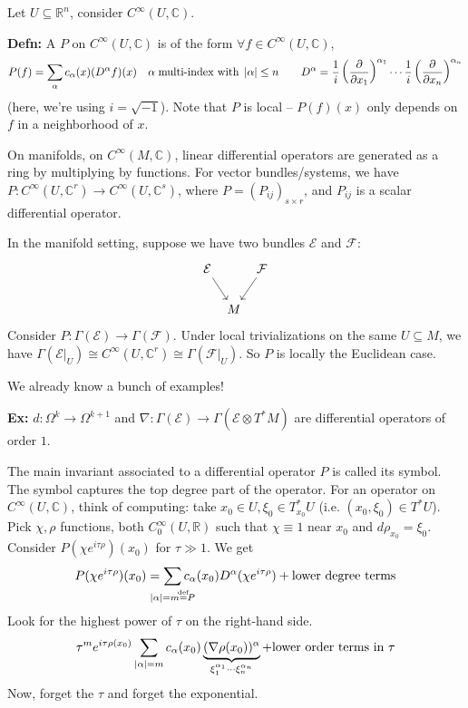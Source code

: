 \documentclass[10pt,letterpaper]{article}
\newcommand{\n}{\hfill\break}
\newcommand{\hangblock}[2]{\par\noindent\settowidth{\hangindent}{\textbf{#1: }}\textbf{#1: }\nolinebreak#2}
\newcommand{\defn}[1]{\hangblock{Defn}{#1}}
\newcommand{\ex}[1]{\hangblock{Ex}{#1}}
\newcommand{\ptxt}[1]{\textrm{\textnormal{#1}}}
\newcommand{\reals}{\mathbb{R}}
\newcommand{\R}{\reals}
\newcommand{\complex}{\mathbb{C}}
\newcommand{\C}{\complex}
\let\deg\relax
\DeclareMathOperator{\deg}{deg}
\newcommand{\abs}[1]{\left|#1\right|}
\newcommand{\restr}[1]{\left.#1\right|}
\newcommand{\pd}[2]{\frac{\partial{}#1}{\partial{}#2}}
\newcommand{\del}{\nabla}
\newcommand{\labeledeq}[1]{\overset{\mathclap{\ptxt{#1}}}{=}}
\newcommand{\eqdef}{\labeledeq{def}}
\newcommand{\paren}[1]{\left(#1\right)}
\let\u\relax
\newcommand{\u}[1]{\underline{#1}}
\newcommand{\mc}[1]{\mathcal{#1}}
\begin{document}
\par\noindent
Let $U\subseteq\R^{n}$, consider $C^{\infty}(U,\C)$.\n

\defn{
	A \u{differential operator} $P$ on $C^{\infty}(U,\C)$ is of the form $\forall{}f\in{}C^{\infty}(U,\C)$,
	\[
		P(f)=\sum_{\alpha}c_{\alpha}(x)(D^{\alpha}f)(x)\quad\alpha\;\ptxt{multi-index with}\;\abs{\alpha}\le{}n\qquad{}D^{\alpha}=\frac{1}{i}\paren{\pd{}{x_{1}}}^{\alpha_{1}}\cdots\frac{1}{i}\paren{\pd{}{x_{n}}}^{\alpha_{n}}
	\]
	(here, we're using $i=\sqrt{-1}$). Note that $P$ is local -- $P(f)(x)$ only depends on $f$ in a neighborhood of $x$.\n
}

\par\noindent
On manifolds, on $C^{\infty}(M,\C)$, linear differential operators are generated as a ring by multiplying by functions. For vector bundles/systems, we have $P:C^{\infty}(U,\C^{r})\to{}C^{\infty}(U,\C^{s})$, where $P=(P_{ij})_{s\times{}r}$, and $P_{ij}$ is a scalar differential operator.\n

\par\noindent
In the manifold setting, suppose we have two bundles $\mc{E}$ and $\mc{F}$:
\[
	\begin{tikzcd}
		\mc{E} \arrow[dr] &[-20pt] &[-20pt] \mc{F} \arrow[dl]\\
		 & M
	\end{tikzcd}
\]
Consider $P:\Gamma(\mc{E})\to\Gamma(\mc{F})$. Under local trivializations on the same $U\subseteq{}M$, we have $\Gamma(\restr{\mc{E}}_{U})\cong{}C^{\infty}(U,\C^{r})\cong\Gamma(\restr{\mc{F}}_{U})$. So $P$ is locally the Euclidean case.\n

\par\noindent
We already know a bunch of examples!\n

\ex{
	$d:\Omega^{k}\to\Omega^{k+1}$ and $\nabla:\Gamma(\mc{E})\to\Gamma(\mc{E}\otimes{}T^{*}M)$ are differential operators of order $1$.\n
}

\par\noindent
The main invariant associated to a differential operator $P$ is called its symbol. The symbol captures the top degree part of the operator. For an operator on $C^{\infty}(U,\C)$, think of computing: take $x_{0}\in{}U,\xi_{0}\in{}T_{x_{0}}^{*}U$ (i.e. $(x_{0},\xi_{0})\in{}T^{*}U$). Pick $\chi,\rho$ functions, both $C^{\infty}_{0}(U,\R)$ such that $\chi\equiv{}1$ near $x_{0}$ and $d\rho_{x_{0}}=\xi_{0}$. Consider $P(\chi{}e^{i\tau\rho})(x_{0})$ for $\tau\gg1$. We get
\[
	P(\chi{}e^{i\tau\rho})(x_{0})=\sum_{\mathclap{\abs{\alpha}=m\eqdef\deg{}P}}c_{\alpha}(x_{0})D^{\alpha}(\chi{}e^{i\tau\rho})+\ptxt{lower degree terms}
\]
Look for the highest power of $\tau$ on the right-hand side.
\[
	\tau^{m}e^{i\tau\rho(x_{0})}\sum_{\abs{\alpha}=m}c_{\alpha}(x_{0})\underbrace{(\del\rho(x_{0}))^{\alpha}}_{\xi_{1}^{\alpha_{1}}\cdots\xi_{n}^{\alpha_{n}}}+\ptxt{lower order terms in $\tau$}
\]
Now, forget the $\tau$ and forget the exponential.\n
\end{document}
